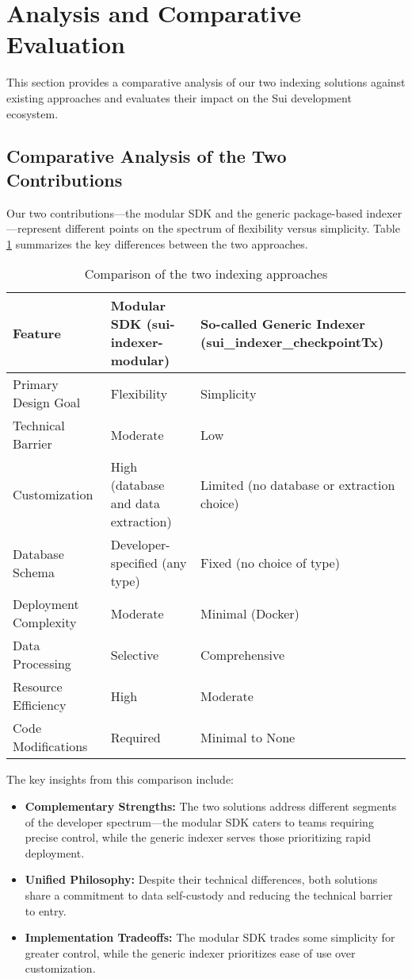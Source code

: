 \section{Analysis and Comparative Evaluation}

This section provides a comparative analysis of our two indexing solutions against existing approaches and evaluates their impact on the Sui development ecosystem.

\subsection{Comparative Analysis of the Two Contributions}

Our two contributions—the modular SDK and the generic package-based indexer—represent different points on the spectrum of flexibility versus simplicity. Table \ref{tab:comparison} summarizes the key differences between the two approaches.

\begin{table}[h]
\centering
\begin{tabular}{p{3.5cm}|p{3.5cm}|p{3.5cm}}
\toprule
\textbf{Feature} & \textbf{Modular SDK (sui-indexer-modular)} & \textbf{So-called Generic Indexer (sui\_indexer\_checkpointTx)} \\
\midrule
Primary Design Goal & Flexibility & Simplicity \\
Technical Barrier & Moderate & Low \\
Customization & High (database and data extraction) & Limited (no database or extraction choice) \\
Database Schema & Developer-specified (any type) & Fixed (no choice of type) \\
Deployment Complexity & Moderate & Minimal (Docker) \\
Data Processing & Selective & Comprehensive \\
Resource Efficiency & High & Moderate \\
Code Modifications & Required & Minimal to None \\
\bottomrule
\end{tabular}
\caption{Comparison of the two indexing approaches}
\label{tab:comparison}
\end{table}

The key insights from this comparison include:

\begin{itemize}
    \item \textbf{Complementary Strengths:} The two solutions address different segments of the developer spectrum—the modular SDK caters to teams requiring precise control, while the generic indexer serves those prioritizing rapid deployment.
    
    \item \textbf{Unified Philosophy:} Despite their technical differences, both solutions share a commitment to data self-custody and reducing the technical barrier to entry.
    
    \item \textbf{Implementation Tradeoffs:} The modular SDK trades some simplicity for greater control, while the generic indexer prioritizes ease of use over customization.
\end{itemize}

